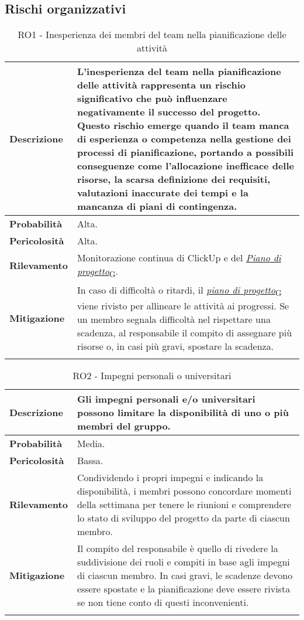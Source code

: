 
\subsection{Rischi organizzativi}
\begin{longtable}{ | l | p{12cm} | }
    \hline
    \textbf{Descrizione} & L'inesperienza del team nella pianificazione delle attività rappresenta un rischio significativo che può influenzare negativamente il successo del progetto. Questo rischio emerge quando il team manca di esperienza o competenza nella gestione dei processi di pianificazione, portando a possibili conseguenze come l'allocazione inefficace delle risorse, la scarsa definizione dei requisiti, valutazioni inaccurate dei tempi e la mancanza di piani di contingenza. \\
    \hline
    \textbf{Probabilità} & Alta. \\
    \hline
    \textbf{Pericolosità} & Alta. \\
    \hline
    \textbf{Rilevamento} & Monitorazione continua di ClickUp e del \href{https://7last.github.io/docs/rtb/documentazione-interna/glossario#piano-di-progetto}{\textit{Piano di progetto}\textsubscript{G}}. \\
    \hline
    \textbf{Mitigazione} & In caso di difficoltà o ritardi, il \href{https://7last.github.io/docs/rtb/documentazione-interna/glossario#piano-di-progetto}{\textit{piano di progetto}\textsubscript{G}} viene rivisto per allineare le attività ai progressi. Se un membro segnala difficoltà nel rispettare una scadenza, al responsabile il compito di assegnare più risorse o, in casi più gravi, spostare la scadenza.\\
    \hline
    \caption{RO1 - Inesperienza dei membri del team nella pianificazione delle attività}
    \label{table:1}
\end{longtable}

\newpage
\begin{longtable}{ | l | p{12cm} | }
    \hline
    \textbf{Descrizione} & Gli impegni personali e/o universitari possono limitare la disponibilità di uno o più membri del gruppo. \\
    \hline
    \textbf{Probabilità} & Media. \\
    \hline
    \textbf{Pericolosità} & Bassa. \\
    \hline
    \textbf{Rilevamento} & Condividendo i propri impegni e indicando la disponibilità, i membri possono concordare momenti della settimana per tenere le riunioni e comprendere lo stato di sviluppo del progetto da parte di ciascun membro. \\
    \hline
    \textbf{Mitigazione} & Il compito del responsabile è quello di rivedere la suddivisione dei ruoli e compiti in base agli impegni di ciascun membro. In casi gravi, le scadenze devono essere spostate e la pianificazione deve essere rivista se non tiene conto di questi inconvenienti.\\
    \hline
    \caption{RO2 - Impegni personali o universitari}
    \label{table:2}
\end{longtable}

